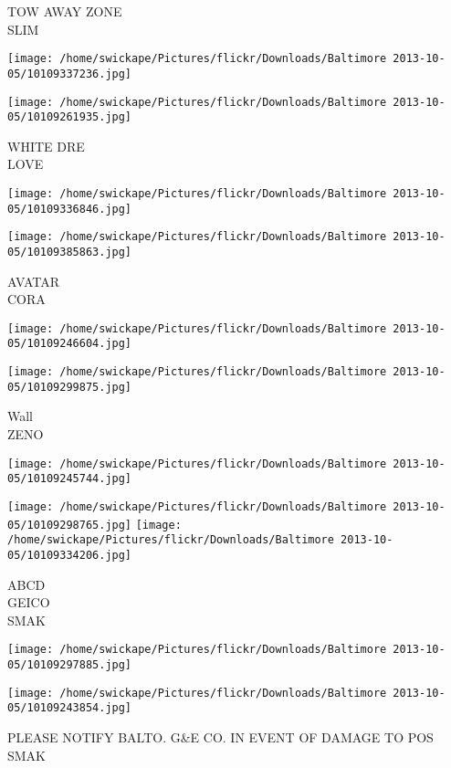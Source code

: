 \documentclass[10pt,letterpaper]{article}
\begin{document}
TOW AWAY ZONE\\
SLIM
\pagebreak

\texttt{[image: /home/swickape/Pictures/flickr/Downloads/Baltimore 2013-10-05/10109337236.jpg]}

\vspace{0.25in}
\texttt{[image: /home/swickape/Pictures/flickr/Downloads/Baltimore 2013-10-05/10109261935.jpg]}

WHITE DRE\\
LOVE
\pagebreak

\texttt{[image: /home/swickape/Pictures/flickr/Downloads/Baltimore 2013-10-05/10109336846.jpg]}

\vspace{0.25in}
\texttt{[image: /home/swickape/Pictures/flickr/Downloads/Baltimore 2013-10-05/10109385863.jpg]}

AVATAR\\
CORA
\pagebreak

\texttt{[image: /home/swickape/Pictures/flickr/Downloads/Baltimore 2013-10-05/10109246604.jpg]}

\vspace{0.25in}
\texttt{[image: /home/swickape/Pictures/flickr/Downloads/Baltimore 2013-10-05/10109299875.jpg]}

Wall\\
ZENO
\pagebreak

\texttt{[image: /home/swickape/Pictures/flickr/Downloads/Baltimore 2013-10-05/10109245744.jpg]}

\vspace{0.25in}
\texttt{[image: /home/swickape/Pictures/flickr/Downloads/Baltimore 2013-10-05/10109298765.jpg]}
\texttt{[image: /home/swickape/Pictures/flickr/Downloads/Baltimore 2013-10-05/10109334206.jpg]}

ABCD\\
GEICO\\
SMAK
\pagebreak

\texttt{[image: /home/swickape/Pictures/flickr/Downloads/Baltimore 2013-10-05/10109297885.jpg]}

\vspace{0.25in}
\texttt{[image: /home/swickape/Pictures/flickr/Downloads/Baltimore 2013-10-05/10109243854.jpg]}

PLEASE NOTIFY BALTO. G\&E CO. IN EVENT OF DAMAGE TO POS\\
SMAK
\pagebreak
\end{document}
